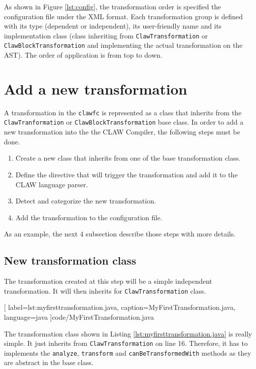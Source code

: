 \documentclass[a4paper, 11pt]{report}
\def\clawfc{\lstinline!clawfc!\xspace}
\begin{document}
As shown in Figure \ref{lst:config}, the transformation order is specified the
configuration file under the XML format.
Each transformation group is defined with its type (dependent or 
independent), its user-friendly name and its implementation class (class 
inheriting from \lstinline|ClawTransformation| or 
\lstinline|ClawBlockTransformation| and implementing the actual transformation
on the AST). The order of application is from top to down.


\section{Add a new transformation}
A transformation in the \clawfc is represented as a class that inherits from 
the \lstinline|ClawTranformation| or \lstinline|ClawBlockTransformation| 
base class. In order to add a new transformation into the the CLAW Compiler, 
the following steps must be done.

\begin{enumerate}
\item Create a new class that inherits from one of the base transformation 
      class.
\item Define the directive that will trigger the transformation and add it 
      to the CLAW language parser.
\item Detect and categorize the new transformation.      
\item Add the transformation to the configuration file.
\end{enumerate}

As an example, the next 4 subsection describe those steps with more details. 

\subsection{New transformation class}
The transformation created at this step will be a simple independent 
transformation. It will then inherits for \lstinline|ClawTransformation| class.


  [
    label=lst:myfirsttransformation.java, 
    caption=MyFirstTransformation.java, 
    language=java
  ]{code/MyFirstTransformation.java}

The transformation class shown in Listing \ref{lst:myfirsttransformation.java}
is really simple. It just inherits from \lstinline|ClawTransformation| on line
16. Therefore, it has to implements the \lstinline|analyze|, 
\lstinline|transform| and \lstinline|canBeTransformedWith| methods as they are 
abstract in the base class. 
\end{document}
